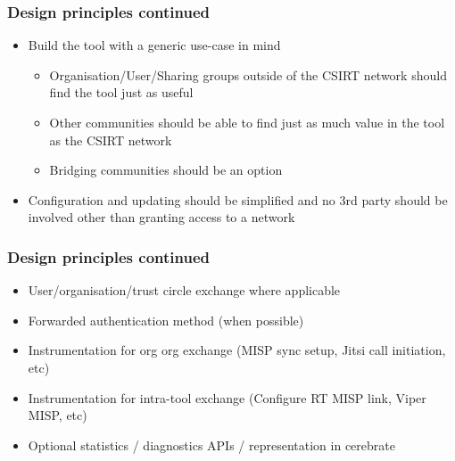\begin{frame}
  \frametitle{Design principles continued}
  \begin{itemize}
    \item Build the tool with a generic use-case in mind
    \begin{itemize}
      \item Organisation/User/Sharing groups outside of the CSIRT network should find the tool just as useful
      \item Other communities should be able to find just as much value in the tool as the CSIRT network
      \item Bridging communities should be an option
    \end{itemize}
    \item Configuration and updating should be simplified and no 3rd party should be involved other than granting access to a network
  \end{itemize}
\end{frame}

\begin{frame}
  \frametitle{Design principles continued}
  \begin{itemize}
    \item User/organisation/trust circle exchange where applicable
    \item Forwarded authentication method (when possible)
    \item Instrumentation for org \- org exchange (MISP sync setup, Jitsi call initiation, etc)
    \item Instrumentation for intra-tool exchange (Configure RT \- MISP link, Viper \- MISP, etc)
    \item Optional statistics / diagnostics APIs / representation in cerebrate
  \end{itemize}
\end{frame}


